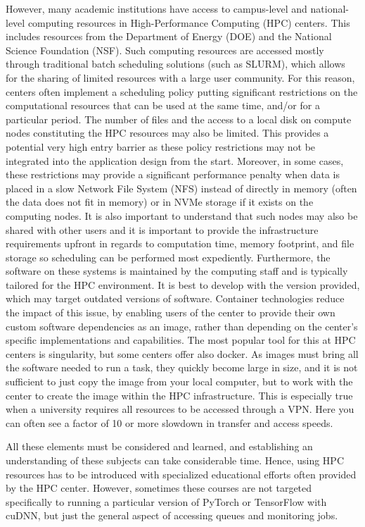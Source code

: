 \documentclass[utf8]{FrontiersinVancouver} %
\begin{document}
However, many academic institutions have access to campus-level and
national-level computing resources in High-Performance Computing (HPC) centers.  This includes
resources from the Department of Energy (DOE) and the National Science Foundation (NSF). Such computing resources are accessed
mostly through traditional batch scheduling solutions (such as SLURM), which allows
for the sharing of limited resources with a large user community. For
this reason, centers often implement a scheduling policy putting
significant restrictions on the computational resources that can be
used at the same time, and/or for a particular period. The number of
files and the access to a local disk on compute nodes constituting the
HPC resources may also be limited.  This provides a potential very high
entry barrier as these policy restrictions may not be integrated into
the application design from the start.  Moreover, in some cases, these
restrictions may provide a significant performance penalty when data
is placed in a slow Network File System (NFS) instead of directly in memory
(often the data does not fit in memory) or in NVMe storage if it
exists on the computing nodes.  It is also important to understand
that such nodes may also be shared with other users and it is
important to provide the infrastructure requirements upfront in regards to computation
time, memory footprint, and file storage so
scheduling can be performed most expediently.  Furthermore, the
software on these systems is maintained by the computing staff and is
typically tailored for the HPC environment.  It is best to develop with the
version provided, which may target outdated versions of software.  Container technologies reduce the impact of this issue, by
enabling users of the center to provide their own custom software dependencies as an image, rather than depending on the center's specific implementations and capabilities.
The most popular tool for this at HPC centers is singularity, but
some centers offer also docker.  As images must bring all the software needed to run a task, they quickly become
large in size, and it is not sufficient to just copy the image from your local
computer, but to work with the center to create the image
within the HPC infrastructure. This is especially true when a
university requires all resources to be accessed through a VPN. Here
you can often see a factor of 10 or more slowdown in transfer and
access speeds.

All these elements must be considered and learned, and establishing an understanding of these subjects can take considerable
time. Hence, using HPC resources has to be introduced with specialized
educational efforts often provided by the HPC center. However,
sometimes these courses are not targeted specifically to running a
particular version of PyTorch or TensorFlow with cuDNN, but just the
general aspect of accessing queues and monitoring jobs.
\end{document}
